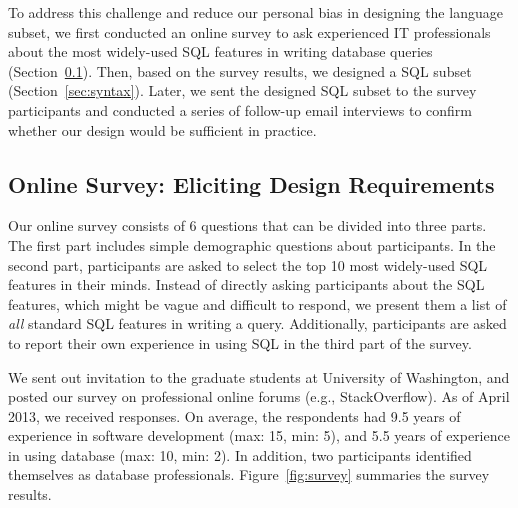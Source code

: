 To address this challenge and reduce our personal bias
in designing the language subset, we first conducted an online survey
to ask experienced IT professionals about the most widely-used
SQL features in writing database queries (Section~\ref{sec:survey}).
Then, based on the survey results, we designed
a SQL subset (Section~\ref{sec:syntax}).  
Later, we sent the designed SQL subset to the survey participants
and conducted a series of follow-up email interviews
to confirm whether our design would be sufficient in practice.









\subsection{Online Survey: Eliciting Design Requirements}
\label{sec:survey}


Our online survey consists of 6 questions that can be
divided into three parts. The first part includes
simple demographic questions about participants.
In the second part, participants are asked to select
the top 10 most widely-used SQL features in their minds.
Instead of directly asking participants about the SQL
features, which might be vague and difficult to respond,
we present them a list of \textit{all} standard
SQL features in writing a query.
Additionally, participants are asked to report their 
own experience in using SQL in the third part of the survey.



We sent out invitation to the graduate students at
University of Washington, and posted our survey on
professional online forums (e.g., StackOverflow).
As of April 2013, we received \respnum responses.
On average, the respondents had 9.5 years of experience
in software development (max: 15, min: 5),
and 5.5 years of experience in
using database (max: 10, min: 2). In addition, two
participants identified themselves as database professionals.
Figure~\ref{fig:survey} summaries the survey results.

